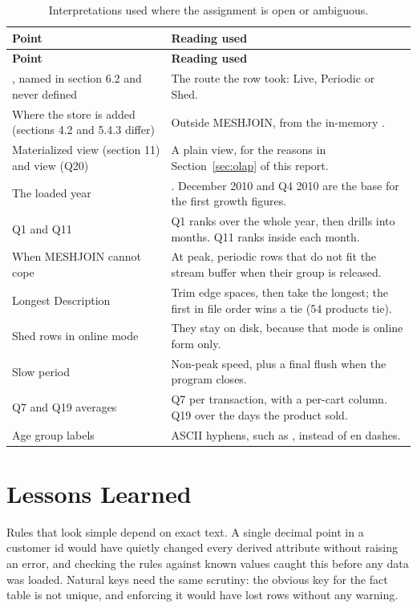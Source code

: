 \documentclass[11pt,a4paper]{article}
\newcommand{\code}[1]{\texttt{\detokenize{#1}}}
\begin{document}
\begin{longtable}{@{}>{\raggedright\arraybackslash}p{5.6cm}>{\raggedright\arraybackslash}p{9.2cm}@{}}
\caption{Interpretations used where the assignment is open or ambiguous.}\\
\toprule \textbf{Point} & \textbf{Reading used} \\ \midrule \endfirsthead
\toprule \textbf{Point} & \textbf{Reading used} \\ \midrule \endhead
\bottomrule \endfoot
    \code{processing_mode}, named in section 6.2 and never defined & The route the row took: Live, Periodic or Shed. \\
    Where the store is added (sections 4.2 and 5.4.3 differ) & Outside MESHJOIN, from the in-memory \code{Store_list}. \\
    Materialized view (section 11) and view (Q20) & A plain view, for the reasons in Section~\ref{sec:olap} of this report. \\
    The loaded year & 2011. December 2010 and Q4 2010 are the base for the first growth figures. \\
    Q1 and Q11 & Q1 ranks over the whole year, then drills into months. Q11 ranks inside each month. \\
    When MESHJOIN cannot cope & At peak, periodic rows that do not fit the stream buffer when their group is released. \\
    Longest Description & Trim edge spaces, then take the longest; the first in file order wins a tie (54 products tie). \\
    Shed rows in online mode & They stay on disk, because that mode is online form only. \\
    Slow period & Non-peak speed, plus a final flush when the program closes. \\
    Q7 and Q19 averages & Q7 per transaction, with a per-cart column. Q19 over the days the product sold. \\
    Age group labels & ASCII hyphens, such as \code{0-17}, instead of en dashes. \\
\end{longtable}

\section{Lessons Learned}

Rules that look simple depend on exact text. A single decimal point in a customer id would have quietly changed every derived attribute without raising an error, and checking the rules against known values caught this before any data was loaded. Natural keys need the same scrutiny: the obvious key for the fact table is not unique, and enforcing it would have lost rows without any warning.
\end{document}
